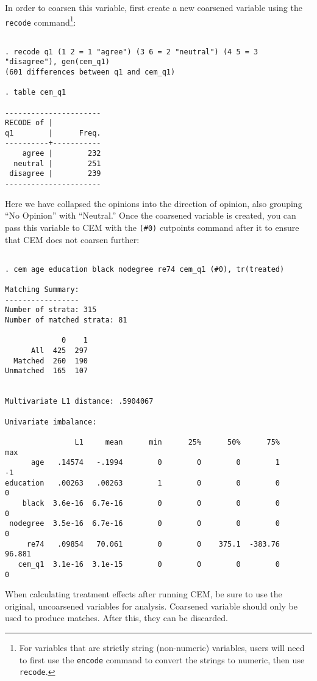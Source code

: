 \documentclass[11pt,titlepage]{article}
\begin{document}
In order to coarsen this variable, first create a new coarsened variable
using the \texttt{recode} command\footnote{For variables that are strictly
  string (non-numeric) variables, users will need to first use the
  \texttt{encode} command to convert the strings to numeric, then use
  \texttt{recode}.}:
\begin{verbatim}

. recode q1 (1 2 = 1 "agree") (3 6 = 2 "neutral") (4 5 = 3 "disagree"), gen(cem_q1)
(601 differences between q1 and cem_q1)

. table cem_q1

----------------------
RECODE of |
q1        |      Freq.
----------+-----------
    agree |        232
  neutral |        251
 disagree |        239
----------------------

\end{verbatim}

Here we have collapsed the opinions into the direction of opinion, also
grouping ``No Opinion'' with ``Neutral.''  Once the coarsened variable is
created, you can pass this variable to CEM with the \texttt{(\#0)}
cutpoints command after it to ensure that CEM does not coarsen further:

\begin{verbatim}

. cem age education black nodegree re74 cem_q1 (#0), tr(treated)

Matching Summary:
-----------------
Number of strata: 315
Number of matched strata: 81

             0    1
      All  425  297
  Matched  260  190
Unmatched  165  107


Multivariate L1 distance: .5904067

Univariate imbalance:

                L1     mean      min      25%      50%      75%      max
      age   .14574   -.1994        0        0        0        1       -1
education   .00263   .00263        1        0        0        0        0
    black  3.6e-16  6.7e-16        0        0        0        0        0
 nodegree  3.5e-16  6.7e-16        0        0        0        0        0
     re74   .09854   70.061        0        0    375.1  -383.76   96.881
   cem_q1  3.1e-16  3.1e-15        0        0        0        0        0

\end{verbatim}

When calculating treatment effects after running CEM, be sure to use the
original, uncoarsened variables for analysis. Coarsened variable should
only be used to produce matches. After this, they can be discarded. 
\end{document}

